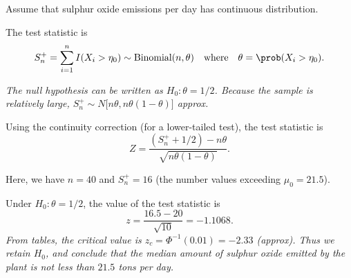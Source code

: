 \begin{solution}
Assume that sulphur oxide emissions per day has continuous distribution.

The test statistic is 
\[
S^{+}_n = \sum_{i=1}^n I(X_i > \eta_0) \sim \text{Binomial}(n,\theta) \text{\quad where\quad} \theta=\prob(X_i>\eta_0).
\]

\bit
\it The null hypothesis can be written as $H_0:\theta=1/2$.
\it Because the sample is relatively large, $S^{+}_n\sim N\big[n\theta,n\theta(1-\theta)\big]$ approx.
\eit

Using the continuity correction (for a lower-tailed test), the test statistic is 
\[
Z = \displaystyle\frac{(S^{+}_n+1/2)-n\theta}{\sqrt{n\theta(1-\theta)}}.
\]

Here, we have $n=40$ and $S^{+}_n=16$ (the number values exceeding $\mu_0 = 21.5$). 

Under $H_0:\theta=1/2$, the value of the test statistic is
\[
z = \frac{16.5 - 20}{\sqrt{10}} = -1.1068.
\]
\bit
\it From tables, the critical value is $z_c = \Phi^{-1}(0.01) = -2.33$ (approx). 
\it Thus we retain $H_0$, and conclude that the median amount of sulphur oxide emitted by the plant is not less than $21.5$ tons per day.
\eit
\end{solution}
\stopcontents[chapters]
\endinput
